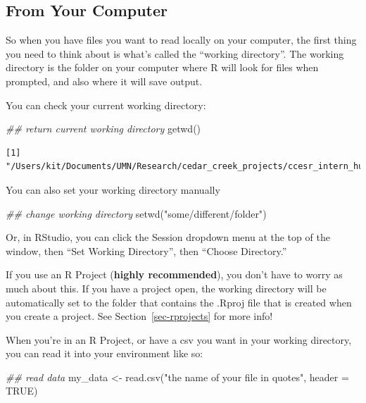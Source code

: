\documentclass[
  letterpaper,
  DIV=11,
  numbers=noendperiod]{scrreprt}
\newenvironment{Shaded}{\begin{snugshade}}{\end{snugshade}}
\newcommand{\AttributeTok}[1]{\textcolor[rgb]{0.40,0.45,0.13}{#1}}
\newcommand{\ConstantTok}[1]{\textcolor[rgb]{0.56,0.35,0.01}{#1}}
\newcommand{\DocumentationTok}[1]{\textcolor[rgb]{0.37,0.37,0.37}{\textit{#1}}}
\newcommand{\FunctionTok}[1]{\textcolor[rgb]{0.28,0.35,0.67}{#1}}
\newcommand{\NormalTok}[1]{\textcolor[rgb]{0.00,0.23,0.31}{#1}}
\newcommand{\OtherTok}[1]{\textcolor[rgb]{0.00,0.23,0.31}{#1}}
\newcommand{\StringTok}[1]{\textcolor[rgb]{0.13,0.47,0.30}{#1}}
\begin{document}
\subsection{From Your Computer}\label{from-your-computer}

So when you have files you want to read locally on your computer, the
first thing you need to think about is what's called the ``working
directory''. The working directory is the folder on your computer where
R will look for files when prompted, and also where it will save output.

You can check your current working directory:

\begin{Shaded}
\begin{Highlighting}[]
\DocumentationTok{\#\# return current working directory}
\FunctionTok{getwd}\NormalTok{()}
\end{Highlighting}
\end{Shaded}

\begin{verbatim}
[1] "/Users/kit/Documents/UMN/Research/cedar_creek_projects/ccesr_intern_hub"
\end{verbatim}

You can also set your working directory manually

\begin{Shaded}
\begin{Highlighting}[]
\DocumentationTok{\#\# change working directory}
\FunctionTok{setwd}\NormalTok{(}\StringTok{"some/different/folder"}\NormalTok{)}
\end{Highlighting}
\end{Shaded}

Or, in RStudio, you can click the Session dropdown menu at the top of
the window, then ``Set Working Directory'', then ``Choose Directory.''

If you use an R Project (\textbf{highly recommended}), you don't have to
worry as much about this. If you have a project open, the working
directory will be automatically set to the folder that contains the
.Rproj file that is created when you create a project. See
Section~\ref{sec-rprojects} for more info!

When you're in an R Project, or have a csv you want in your working
directory, you can read it into your environment like so:

\begin{Shaded}
\begin{Highlighting}[]
\DocumentationTok{\#\# read data}
\NormalTok{my\_data }\OtherTok{\textless{}{-}} \FunctionTok{read.csv}\NormalTok{(}\StringTok{"the name of your file in quotes"}\NormalTok{, }\AttributeTok{header =} \ConstantTok{TRUE}\NormalTok{)}
\end{Highlighting}
\end{Shaded}
\end{document}
